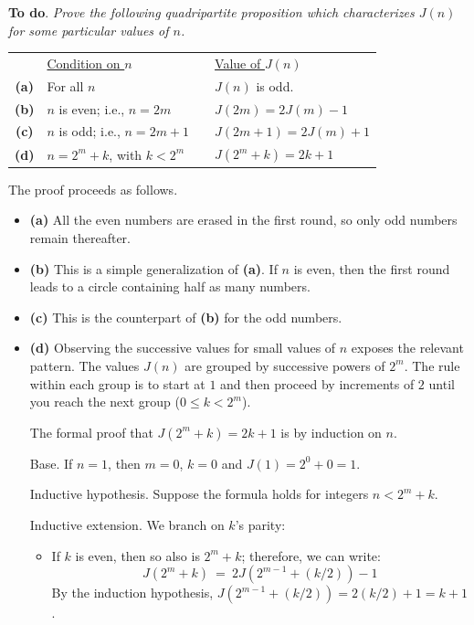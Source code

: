 \begin{itemize}
\medskip

{\bf To do}. {\em Prove the following quadripartite proposition which characterizes $J(n)$ for some particular values of $n$.}

\hspace*{.25in}
\begin{tabular}{clll}
 & \underline{Condition on $n$} & \hspace*{.1in} & \underline{Value of $J(n)$} \\ 
{\bf (a)} &
For all $n$ &  & $J(n)$ is odd. \\
{\bf (b)} &
$n$ is even; i.e., $n = 2m$ & & $J(2m) = 2J(m)-1$ \\
{\bf (c)} &
$n$ is odd; i.e., $n = 2m+1$ & & $J(2m+1) = 2J(m)+1$ \\
{\bf (d)} &
$n = 2^m+k$, with $k < 2^m$ & & $J(2^m+k) = 2k+1$
\end{tabular}

The proof proceeds as follows.
\begin{itemize}
\item {\bf (a)} 
All the even numbers are erased in the first round, so only odd numbers remain thereafter.

\medskip
\item {\bf (b)} 
This is a simple generalization of {\bf (a)}.  If $n$ is even, then the first round leads to a circle containing half as many numbers. 

\medskip
\item {\bf (c)} 
This is the counterpart of {\bf (b)} for the odd numbers.

\medskip
\item {\bf (d)} 
Observing the successive values for small values of $n$ exposes the relevant pattern.
The values $J(n)$ are grouped by successive powers of $2^m$.  The rule within each group is to start at $1$ and then proceed by increments of $2$ until you reach the next group
($0 \leq k < 2^m$).

\medskip

The formal proof that $J(2^m+k) = 2k+1$ is by induction on $n$.

\smallskip

{\sf Base}.
If $n=1$, then $m=0$, $k=0$ and $J(1) = 2^0+0 = 1$.

\smallskip
 
{\sf Inductive hypothesis}.
Suppose the formula holds for integers $n < 2^m+k$.
\smallskip

{\sf Inductive extension}.
We branch on $k$'s parity:
\begin{itemize}
\item If $k$ is even, then so also is $2^m+k$; therefore, we can write:
\[ J(2^m+k) \ = \ 2J(2^{m-1}+(k/2))-1 \]
By the induction hypothesis, $J(2^{m-1} + (k/2)) = 2(k/2) +1 = k+1$.


\end{itemize}
\end{itemize}
\end{itemize}

